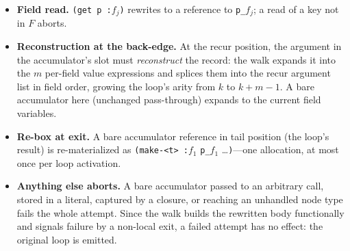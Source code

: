 \documentclass[sigplan,screen,review,anonymous]{acmart}
\begin{document}
\begin{itemize}
  \item \textbf{Field read.} \texttt{(get p :}$f_j$\texttt{)} rewrites to a
  reference to \texttt{p\_}$f_j$; a read of a key not in $F$ aborts.
  \item \textbf{Reconstruction at the back-edge.} At the recur position, the
  argument in the accumulator's slot must \emph{reconstruct} the record: the
  walk expands it into the $m$ per-field value expressions and splices them
  into the recur argument list in field order, growing the loop's arity
  from $k$ to $k+m-1$. A bare accumulator here (unchanged pass-through)
  expands to the current field variables.
  \item \textbf{Re-box at exit.} A bare accumulator reference in tail
  position (the loop's result) is re-materialized as \texttt{(make-<t> :}$f_1$
  \texttt{p\_}$f_1$ \ldots\texttt{)}---one allocation, at most once per
  loop activation.
  \item \textbf{Anything else aborts.} A bare accumulator passed to an
  arbitrary call, stored in a literal, captured by a closure, or reaching an
  unhandled node type fails the whole attempt. Since the walk builds the
  rewritten body functionally and signals failure by a non-local exit, a
  failed attempt has no effect: the original loop is emitted.
\end{itemize}
\end{document}
